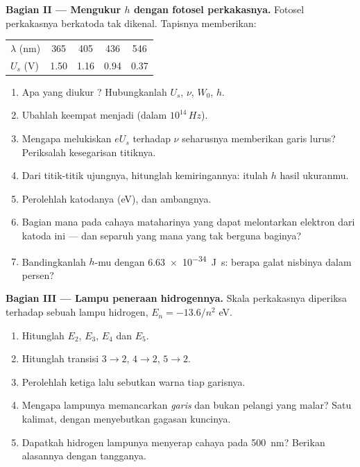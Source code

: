 \begin{problem}
\medskip
\noindent\textbf{Bagian II --- Mengukur $h$ dengan fotosel perkakasnya.}
Fotosel perkakasnya berkatoda tak dikenal. Tapisnya memberikan:
\begin{center}\small
\begin{tabular}{lcccc}
$\lambda$ (\unit{nm}) & 365 & 405 & 436 & 546\\
$U_s$ (\unit{V}) & 1.50 & 1.16 & 0.94 & 0.37
\end{tabular}
\end{center}
\begin{enumerate}[resume]
  \item Apa yang diukur ? Hubungkanlah $U_s$, $\nu$, $W_0$, $h$.
  \item Ubahlah keempat  menjadi  (dalam $10^{14}\,\unit{Hz}$).
  \item Mengapa melukiskan $eU_s$ terhadap $\nu$ seharusnya memberikan garis lurus?
        Periksalah kesegarisan titiknya.
  \item Dari titik-titik ujungnya, hitunglah kemiringannya: itulah $h$ hasil ukuranmu.
  \item Perolehlah  katodanya (\unit{eV}),  dan  ambangnya.
  \item Bagian mana pada cahaya mataharinya yang dapat melontarkan elektron dari
        katoda ini --- dan separuh  yang mana yang tak berguna baginya?
  \item Bandingkanlah $h$-mu dengan \qty{6.63e-34}{J.s}: berapa galat nisbinya dalam persen?
\end{enumerate}

\medskip
\noindent\textbf{Bagian III --- Lampu peneraan hidrogennya.}
Skala  perkakasnya diperiksa terhadap sebuah lampu hidrogen,
$E_n = -13.6/n^2$ \unit{eV}.
\begin{enumerate}[resume]
  \item Hitunglah $E_2$, $E_3$, $E_4$ dan $E_5$.
  \item Hitunglah   transisi $3 \to 2$, $4 \to 2$, $5 \to 2$.
  \item Perolehlah ketiga  lalu sebutkan warna tiap garisnya.
  \item Mengapa lampunya memancarkan \emph{garis} dan bukan pelangi yang
        malar? Satu kalimat, dengan menyebutkan gagasan kuncinya.
  \item Dapatkah hidrogen lampunya menyerap cahaya pada \qty{500}{nm}? Berikan alasannya dengan tangganya.
\end{enumerate}


\end{problem}
